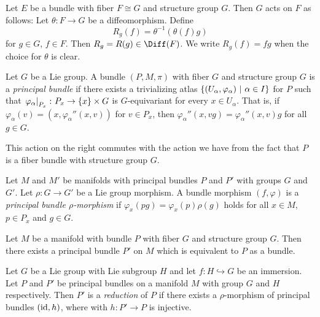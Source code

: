 \begin{zgled}
Let $E$ be a bundle with fiber $F \cong G$ and structure group $G$.
Then $G$ acts on $F$ as follows: Let $\theta \colon F \to G$ be a
diffeomorphism. Define
\[
R_g(f) = \theta^{-1}(\theta(f) g)
\]
for $g \in G$, $f \in F$. Then $R_g = R(g) \in \Diff(F)$. We write
$R_g(f) = fg$ when the choice for $\theta$ is clear.
\end{zgled}

\begin{definicija}
Let $G$ be a Lie group. A bundle $(P, M, \pi)$ with fiber $G$ and
structure group $G$ is a
\emph{principal bundle} if there exists a
trivializing atlas
$\left\{(U_\alpha, \varphi_\alpha)~\middle\vert~\alpha \in I\right\}$ for $P$ such that
$\left. \varphi_\alpha\right|_{P_x}^{} \colon P_x \to \left\{x\right\} \times G$ is
$G$-equivariant for every $x \in U_\alpha$. That is, if
$\varphi_\alpha(v) = (x, \varphi_\alpha''(x,v))$ for $v \in P_x$,
then $\varphi_\alpha''(x, vg) = \varphi_\alpha''(x,v) g$ for all
$g \in G$.
\end{definicija}

\begin{opomba}
This action on the right commutes with the action we have from the
fact that $P$ is a fiber bundle with structure group $G$.
\end{opomba}

\begin{definicija}
Let $M$ and $M'$ be manifolds with principal bundles $P$ and $P'$
with groups $G$ and $G'$. Let $\rho \colon G \to G'$ be a Lie group
morphism. A bundle morphism $(f, \varphi)$ is a
\emph{principal bundle $\rho$-morphism}
if $\varphi_x(pg) = \varphi_x(p) \rho(g)$ holds for all $x \in M$,
$p \in P_x$ and $g \in G$.
\end{definicija}

\begin{lema}
Let $M$ be a manifold with bundle $P$ with fiber $G$ and structure
group $G$. Then there exists a principal bundle $P'$ on $M$ which
is equivalent to $P$ as a bundle.
\end{lema}

\begin{definicija}
Let $G$ be a Lie group with Lie subgroup $H$ and let
$f \colon H \hookrightarrow G$ be an immersion. Let $P$ and $P'$ be
principal bundles on a manifold $M$ with group $G$ and $H$
respectively. Then $P'$ is a \emph{reduction} of
$P$ if there exists a $\rho$-morphism of principal bundles
$(\operatorname{id}, h)$, where with $h \colon P' \to P$ is injective.
\end{definicija}

